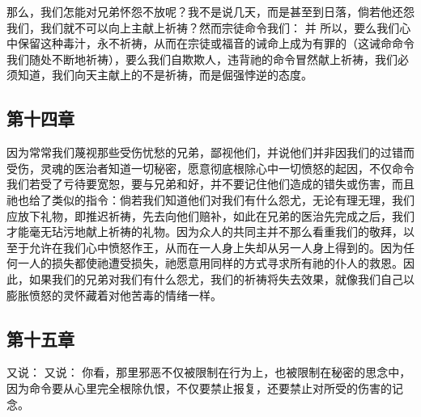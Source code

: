   那么，我们怎能对兄弟怀怨不放呢？我不是说几天，而是甚至到日落，倘若他还怨我们，我们就不可以向上主献上祈祷？然而宗徒命令我们：  并  所以，要么我们心中保留这种毒汁，永不祈祷，从而在宗徒或福音的诫命上成为有罪的（这诫命命令我们随处不断地祈祷），要么我们自欺欺人，违背祂的命令冒然献上祈祷，我们必须知道，我们向天主献上的不是祈祷，而是倔强悖逆的态度。\par


\subsection{第十四章}

\par

因为常常我们蔑视那些受伤忧愁的兄弟，鄙视他们，并说他们并非因我们的过错而受伤，灵魂的医治者知道一切秘密，愿意彻底根除心中一切愤怒的起因，不仅命令我们若受了亏待要宽恕，要与兄弟和好，并不要记住他们造成的错失或伤害，而且祂也给了类似的指令：倘若我们知道他们对我们有什么怨尤，无论有理无理，我们应放下礼物，即推迟祈祷，先去向他们赔补，如此在兄弟的医治先完成之后，我们才能毫无玷污地献上祈祷的礼物。因为众人的共同主并不那么看重我们的敬拜，以至于允许在我们心中愤怒作王，从而在一人身上失却从另一人身上得到的。因为任何一人的损失都使祂遭受损失，祂愿意用同样的方式寻求所有祂的仆人的救恩。因此，如果我们的兄弟对我们有什么怨尤，我们的祈祷将失去效果，就像我们自己以膨胀愤怒的灵怀藏着对他苦毒的情绪一样。\par


\subsection{第十五章}

\par

 又说：  又说： 你看，那里邪恶不仅被限制在行为上，也被限制在秘密的思念中，因为命令要从心里完全根除仇恨，不仅要禁止报复，还要禁止对所受的伤害的记念。\par

